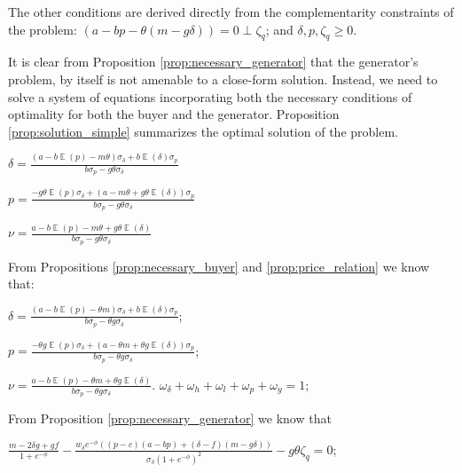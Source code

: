 \documentclass[informs]{informs3}
\begin{document}
The other conditions are derived directly from the complementarity constraints of the problem: 
$(a - bp -\theta (m -g\delta)) = 0 \perp \zeta_q$; and $\delta, p, \zeta_q \geq 0$.
\Halmos
\endproof 


It is clear from Proposition \ref{prop:necessary_generator} that the generator's problem, by itself is not amenable to a close-form solution. Instead, we need to solve a system of equations incorporating both the necessary conditions of optimality for both the buyer and the generator. Proposition \ref{prop:solution_simple} summarizes the optimal solution of the problem. 

\begin{proposition}\label{prop:solution_simple}


$\delta = \frac{\left(a - b\mathop{\mathbb{E}}\left(p\right)- m \theta \right) \sigma_{\delta}  + b\mathop{\mathbb{E}}\left(\delta\right) \sigma_{p} }{b \sigma_{p} -  g \theta \sigma_{\delta}}$


$p = \frac{- g \theta \mathop{\mathbb{E}}\left(p\right) \sigma_{\delta}  + 
\left(a-m \theta+
g \theta \mathop{\mathbb{E}}\left(\delta\right) 
\right) \sigma_{p} }{b \sigma_{p} -  g \theta \sigma_{\delta}}$


$\nu = \frac{a - b \mathop{\mathbb{E}}\left(p\right) - m \theta +  g \theta \mathop{\mathbb{E}}\left(\delta\right) }{b \sigma_{p} -  g \theta \sigma_{\delta}}$

\end{proposition}
%
From Propositions \ref{prop:necessary_buyer} and \ref{prop:price_relation} we know that:

$\delta=\frac{\left(a-b\mathop{\mathbb{E}}\left(p\right) -\theta m\right)\sigma_{\delta}+b\mathop{\mathbb{E}}\left(\delta\right)\sigma_{p}}{b\sigma_{p}-\theta g\sigma_{\delta}}$;

$p =\frac{-\theta g \mathop{\mathbb{E}}\left(p\right)\sigma_{\delta}+\left(a-\theta m+\theta g \mathop{\mathbb{E}}\left(\delta\right)\right)\sigma_{p}}{b\sigma_{p}-\theta g\sigma_{\delta}}$;

$\nu =\frac{a-b \mathop{\mathbb{E}}\left(p\right)-\theta m+\theta g \mathop{\mathbb{E}}\left(\delta\right)}{b\sigma_{p}-\theta g\sigma_{\delta}}$.
$\omega_{\delta}+\omega_{h}+\omega_{l}+\omega_{p}+\omega_{y}=1$;		

From Proposition \ref{prop:necessary_generator} we know that 

$\frac{m-2\delta g + g f}{1+e^{-\phi}}-\frac{w_{\delta} e^{-\phi} \left(\left(p-c\right)(a - bp )  +\left(\delta-f\right)(m -g\delta)\right)}{\sigma_{\delta}(1+e^{-\phi})^{2}}-g \theta \zeta_q =0$;
\end{document}
